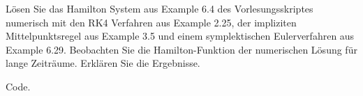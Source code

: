 \begin{exercise}
  Lösen Sie das Hamilton System aus Example 6.4 des Vorlesungsskriptes
  numerisch mit den RK4 Verfahren aus Example 2.25, der impliziten
  Mittelpunktsregel aus Example 3.5 und einem symplektischen
  Eulerverfahren aus Example 6.29. Beobachten Sie die
  Hamilton-Funktion der numerischen Lösung für lange Zeiträume.
  Erklären Sie die Ergebnisse.
\end{exercise}

\begin{solution}
  Code.
\end{solution}
